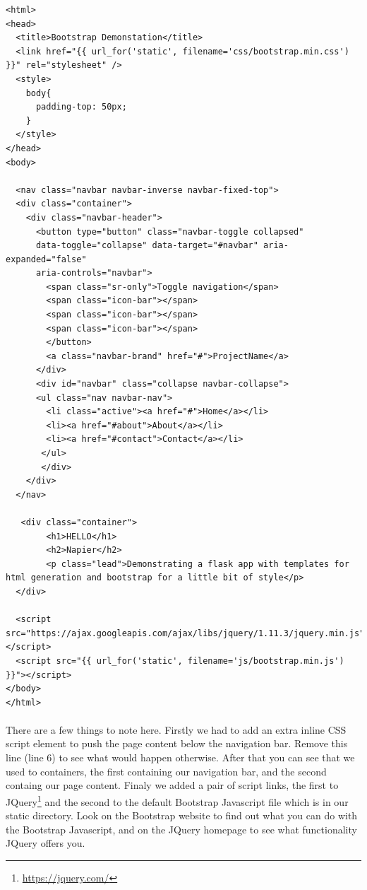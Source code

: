 \documentclass[12pt, a4paper, oneside]{book}
\begin{document}
\begin{lstlisting}
<html>
<head>
  <title>Bootstrap Demonstation</title>
  <link href="{{ url_for('static', filename='css/bootstrap.min.css') }}" rel="stylesheet" />
  <style>
    body{ 
      padding-top: 50px;
    } 
  </style>
</head>
<body>

  <nav class="navbar navbar-inverse navbar-fixed-top">
  <div class="container">
    <div class="navbar-header">
      <button type="button" class="navbar-toggle collapsed"
      data-toggle="collapse" data-target="#navbar" aria-expanded="false"
      aria-controls="navbar">
        <span class="sr-only">Toggle navigation</span>
        <span class="icon-bar"></span>
        <span class="icon-bar"></span>
        <span class="icon-bar"></span>
        </button>
        <a class="navbar-brand" href="#">ProjectName</a>
      </div>
      <div id="navbar" class="collapse navbar-collapse">
      <ul class="nav navbar-nav">
        <li class="active"><a href="#">Home</a></li>
        <li><a href="#about">About</a></li>
        <li><a href="#contact">Contact</a></li>
       </ul>
       </div>
    </div>
  </nav>

   <div class="container">
        <h1>HELLO</h1>
        <h2>Napier</h2>
        <p class="lead">Demonstrating a flask app with templates for html generation and bootstrap for a little bit of style</p>
  </div>

  <script src="https://ajax.googleapis.com/ajax/libs/jquery/1.11.3/jquery.min.js"></script>
  <script src="{{ url_for('static', filename='js/bootstrap.min.js') }}"></script>
</body>
</html>
\end{lstlisting}

\paragraph{} There are a few things to note here. Firstly we had to add an extra inline CSS script element to push the page content below the navigation bar. Remove this line (line 6) to see what would happen otherwise. After that you can see that we used to containers, the first containing our navigation bar, and the second containg our page content. Finaly we added a pair of script links, the first to JQuery\footnote{\url{https://jquery.com/}} and the second to the default Bootstrap Javascript file which is in our static directory. Look on the Bootstrap website to find out what you can do with the Bootstrap Javascript, and on the JQuery homepage to see what functionality JQuery offers you.
\end{document}
